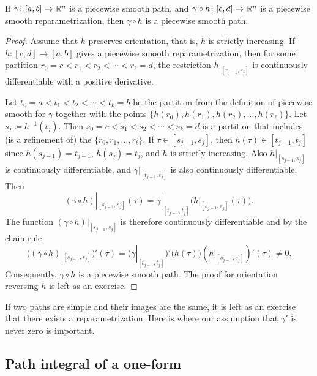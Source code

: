 \begin{prop} \label{prop:reparamapiecewisesmooth}
If $\gamma \colon [a,b] \to {\mathbb{R}}^n$ is a piecewise smooth path,
and $\gamma \circ h \colon [c,d] \to {\mathbb{R}}^n$ is
a piecewise smooth reparametrization, then $\gamma \circ h$
is a piecewise smooth path.
\end{prop}

\begin{proof}
Assume that $h$ preserves orientation, that is, $h$ is strictly
increasing.
If $h \colon [c,d] \to [a,b]$ gives a piecewise smooth reparametrization,
then for some partition
$r_0 = c < r_1 < r_2 < \cdots < r_\ell = d$, the restriction
$h|_{[r_{j-1},r_j]}$ is continuously differentiable with a positive
derivative.

Let $t_0 = a < t_1 < t_2 < \cdots < t_k = b$ be the partition from the
definition of piecewise smooth for $\gamma$ together with the 
points $\{ h(r_0), h(r_1), h(r_2), \ldots, h(r_\ell) \}$.
Let $s_j \coloneqq h^{-1}(t_j)$.  Then
$s_0 = c < s_1 < s_2 < \cdots < s_k = d$
is a partition that includes (is a refinement of) the
$\{ r_0,r_1,\ldots,r_\ell \}$.
If $\tau \in [s_{j-1},s_j]$, then $h(\tau) \in [t_{j-1},t_j]$
since $h(s_{j-1}) = t_{j-1}$,
$h(s_{j}) = t_j$, and
$h$ is strictly increasing.
Also $h|_{[s_{j-1},s_j]}$ is continuously differentiable, and
$\gamma|_{[t_{j-1},t_j]}$ is also continuously differentiable.
Then
\begin{equation*}
(\gamma \circ h)|_{[s_{j-1},s_{j}]} (\tau)
=
\gamma|_{[t_{j-1},t_{j}]} \bigl( h|_{[s_{j-1},s_j]}(\tau) \bigr) .
\end{equation*}
The function 
$(\gamma \circ h)|_{[s_{j-1},s_{j}]}$ is therefore continuously
differentiable and
by the chain rule
\begin{equation*}
\bigl( (\gamma \circ h)|_{[s_{j-1},s_{j}]} \bigr) ' (\tau)
=
\bigl( \gamma|_{[t_{j-1},t_{j}]} \bigr)' \bigl( h(\tau) \bigr)
(h|_{[s_{j-1},s_j]})'(\tau) \not= 0 .
\end{equation*}
Consequently, $\gamma \circ h$ is a piecewise smooth path.
The proof for orientation reversing $h$ is left as an exercise.
\end{proof}

If two paths are simple and their images are the same, it is
left as an exercise that there exists a reparametrization.
Here is where our assumption that $\gamma'$ is never zero is important.

\subsection{Path integral of a one-form}

